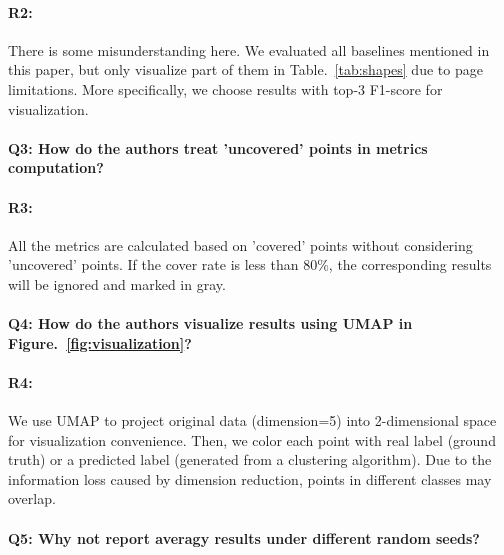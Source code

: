 \documentclass[letterpaper]{article} \usepackage{aaai22}  \usepackage{times}  \usepackage{helvet}  \usepackage{courier}  \usepackage[hyphens]{url}  \usepackage{graphicx} \urlstyle{rm} \def\UrlFont{\rm}  \usepackage{natbib}  \usepackage{caption} \DeclareCaptionStyle{ruled}{labelfont=normalfont,labelsep=colon,strut=off} \frenchspacing  \setlength{\pdfpagewidth}{8.5in}  \setlength{\pdfpageheight}{11in}  \usepackage{subfigure}
\begin{document}
\paragraph{R2:} There is some misunderstanding here. We evaluated all baselines mentioned in this paper, but only visualize part of them in Table.~\ref{tab:shapes} due to page limitations. More specifically, we choose results with top-3 F1-score for visualization.



\paragraph{Q3: How do the authors treat 'uncovered' points in metrics computation?}

\paragraph{R3:} All the metrics are calculated based on 'covered' points without considering 'uncovered' points. If the cover rate is less than 80\%, the corresponding results will be ignored and marked in gray.



\paragraph{Q4: How do the authors visualize results using UMAP in Figure.~\ref{fig:visualization}? } 

\paragraph{R4:} We use UMAP to project original data (dimension=5) into 2-dimensional space for visualization convenience. Then, we color each point with real label (ground truth) or a predicted label (generated from a clustering algorithm). Due to the information loss caused by dimension reduction, points in different classes may overlap.



\paragraph{Q5: Why not report averagy results under different random seeds?}
\end{document}
